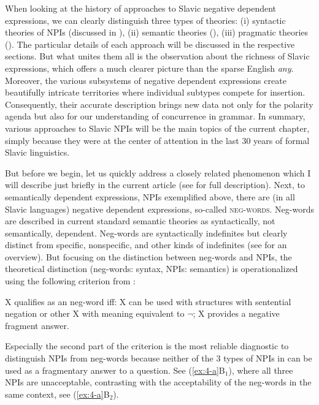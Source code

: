 \documentclass[output=paper,colorlinks,citecolor=brown]{langscibook}
\begin{document}
When looking at the history of approaches to Slavic negative dependent expressions, we can clearly distinguish three types of theories: (i) syntactic theories of NPIs (discussed in ), (ii) semantic theories (), (iii) pragmatic theories (). The particular details of each approach will be discussed in the respective sections. But what unites them all is the observation about the richness of Slavic expressions, which offers a much clearer picture than the sparse English \emph{any}. Moreover, the various subsystems of negative dependent expressions create beautifully intricate territories where individual subtypes compete for insertion. Consequently, their accurate description brings new data not only for the polarity agenda but also for our understanding of concurrence in grammar. In summary, various approaches to Slavic NPIs will be the main topics of the current chapter, simply because they were at the center of attention in the last 30 years of formal Slavic linguistics.

But before we begin, let us quickly address a closely related phenomenon which I will describe just briefly in the current article (see \citealt{Docekal2020} for full description). Next, to semantically dependent expressions, NPIs exemplified above, there are (in all Slavic languages) negative dependent expressions, so-called \textsc{neg-words}. Neg-words are described in current standard semantic theories as syntactically, not semantically, dependent. Neg-words are syntactically indefinites but clearly distinct from specific, nonspecific, and other kinds of indefinites (see  for an overview). But focusing on the distinction between neg-words and NPIs, the theoretical distinction (neg-words: syntax, NPIs: semantics) is operationalized using the following criterion from \citet{giannakidou2017landscape}:

\eanoraggedright X qualifies as an neg-word iff:
\eanoraggedright X can be used with structures with sentential negation or other X with meaning equivalent to $\neg$;
\ex X provides a negative fragment answer.
\z
\z

\noindent Especially the second part of the criterion is the most reliable diagnostic to distinguish NPIs from neg-words because neither of the 3 types of NPIs in  can be used as a fragmentary answer to a question. See (\ref{ex:4-a}B$_1$), where all three NPIs are unacceptable, contrasting with the acceptability of the neg-words in the same context, see (\ref{ex:4-a}B$_2$).
\end{document}
